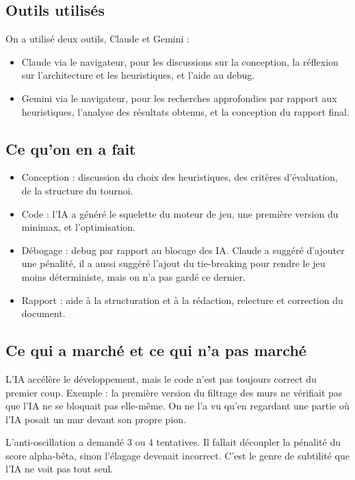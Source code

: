 \documentclass[a4paper, 12pt]{report}
\begin{document}
\subsection{Outils utilisés}

On a utilisé deux outils, Claude et Gemini :
\begin{itemize}
    \item Claude via le navigateur, pour les discussions sur la conception, la réflexion sur l'architecture et les heuristiques, et l'aide au debug.
    \item Gemini via le navigateur, pour les recherches approfondies par rapport aux heuristiques, l'analyse des résultats obtenus, et la conception du rapport final.
\end{itemize}

\subsection{Ce qu'on en a fait}

\begin{itemize}
    \item Conception : discussion du choix des heuristiques, des critères d'évaluation, de la structure du tournoi.
    \item Code : l'IA a généré le squelette du moteur de jeu, une première version du minimax, et l'optimisation.
    \item Débogage : debug par rapport au blocage des IA. Claude a suggéré d'ajouter une pénalité, il a aussi suggéré l'ajout du tie-breaking pour rendre le jeu moins déterministe, mais on n'a pas gardé ce dernier.
    \item Rapport : aide à la structuration et à la rédaction, relecture et correction du document.
\end{itemize}

\subsection{Ce qui a marché et ce qui n'a pas marché}

L'IA accélère le développement, mais le code n'est pas toujours correct du premier coup. Exemple : la première version du filtrage des murs ne vérifiait pas que l'IA ne se bloquait pas elle-même. On ne l'a vu qu'en regardant une partie où l'IA posait un mur devant son propre pion.

L'anti-oscillation a demandé 3 ou 4 tentatives. Il fallait découpler la pénalité du score alpha-bêta, sinon l'élagage devenait incorrect. C'est le genre de subtilité que l'IA ne voit pas tout seul.
\end{document}
